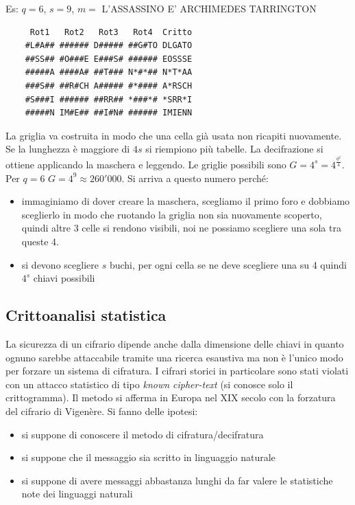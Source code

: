 Es: $q = 6$, $s = 9$, $m = $ L'ASSASSINO E' ARCHIMEDES TARRINGTON
\begin{verbatim}
     Rot1   Rot2   Rot3   Rot4  Critto
    #L#A## ###### D##### ##G#TO DLGATO
    ##SS## #O###E E###S# ###### EOSSSE
    #####A ####A# ##T### N*#*## N*T*AA
    ###S## ##R#CH A##### #*#### A*RSCH
    #S###I ###### ##RR## *###*# *SRR*I
    #####N IM#E## ##I#N# ###### IMIENN
\end{verbatim}

La griglia va costruita in modo che una cella già usata non ricapiti nuovamente. Se la lunghezza è maggiore di $4s$ si riempiono più tabelle. La decifrazione si ottiene applicando la maschera e leggendo. Le griglie possibili sono $G = 4^s = 4^{\frac{q^2}{4}}$. Per $q=6$ $G = 4^9 \approx 260'000$. Si arriva a questo numero perché:
\begin{itemize}
    \item immaginiamo di dover creare la maschera, scegliamo il primo foro e dobbiamo sceglierlo in modo che ruotando la griglia non sia nuovamente scoperto, quindi altre 3 celle si rendono visibili, noi ne possiamo scegliere una sola tra queste 4.
    \item si devono scegliere $s$ buchi, per ogni cella se ne deve scegliere una su 4 quindi $4^s$ chiavi possibili
\end{itemize}

\subsection{Crittoanalisi statistica}
La sicurezza di un cifrario dipende anche dalla dimensione delle chiavi in quanto ognuno sarebbe attaccabile tramite una ricerca esaustiva ma non è l'unico modo per forzare un sistema di cifratura. I cifrari storici in particolare sono stati violati con un attacco statistico di tipo \emph{known cipher-text} (si conosce solo il crittogramma). Il metodo si afferma in Europa nel XIX secolo con la forzatura del cifrario di Vigenère.
Si fanno delle ipotesi:
\begin{itemize}
    \item si suppone di conoscere il metodo di cifratura/decifratura
    \item si suppone che il messaggio sia scritto in linguaggio naturale
    \item si suppone di avere messaggi abbastanza lunghi da far valere le statistiche note dei linguaggi naturali
\end{itemize}

